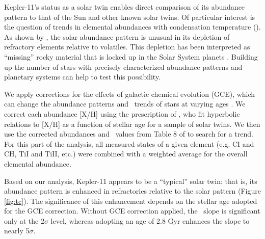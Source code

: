\documentclass[oneside]{emulateapj}
\begin{document}
Kepler-11's status as a solar twin enables direct comparison of its abundance pattern to that of the Sun and other known solar twins. Of particular interest is the question of trends in elemental abundances with condensation temperature (\tc). As shown by \citet{Melendez2009}, the solar abundance pattern is unusual in its depletion of refractory elements relative to volatiles. This depletion has been interpreted as ``missing'' rocky material that is locked up in the Solar System planets \citep{Chambers2010}. Building up the number of stars with precisely characterized abundance patterns and planetary systems can help to test this possibility.

We apply corrections for the effects of galactic chemical evolution (GCE), which can change the abundance patterns and \tc\ trends of stars at varying ages \citep{Nissen2015, Spina2016}. We correct each abundance [X/H] using the prescription of \citet{Spina2016b}, who fit hyperbolic relations to [X/H] as a function of stellar age for a sample of solar twins. We then use the corrected abundances and \tc\ values from Table 8 of \citet{Lodders2003} to search for a trend. For this part of the analysis, all measured states of a given element (e.g. CI and CH, TiI and TiII, etc.) were combined with a weighted average for the overall elemental abundance. %

Based on our analysis, Kepler-11 appears to be a ``typical'' solar twin: that is, its abundance pattern is enhanced in refractories relative to the solar pattern (Figure \ref{fig:tc}). The significance of this enhancement depends on the stellar age adopted for the GCE correction. Without GCE correction applied, the \tc\ slope is significant only at the 2$\sigma$ level, whereas adopting an age of 2.8 Gyr enhances the slope to nearly 5$\sigma$.
\end{document}
